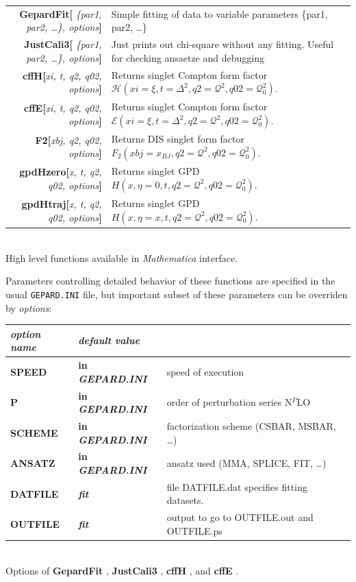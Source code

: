 \documentclass[12pt]{article}
\newcommand{\defboxitem}[3]{ {\ttfamily \bfseries #1[}\emph{#2}{\ttfamily \bfseries ]} & #3 }
\newcommand{\optboxitem}[3]{ {\ttfamily \bfseries #1} & {\ttfamily \bfseries #2 } & #3 }
\newcommand{\mmacomm}[1]{ {\ttfamily \bfseries #1} }
\begin{document}
\begin{flushleft}
\colorbox{defbox}{%
\begin{minipage}{\textwidth}%
\begin{tabular}{rp{8cm}}%
\defboxitem{GepardFit}{ \{par1, par2, \ldots\}, options}{Simple fitting of data to 
variable parameters \{par1, par2, \ldots\}} \\[0.8ex]
\defboxitem{JustCali3}{ \{par1, par2, \ldots\}, options}{Just prints out chi-square without
any fitting. Useful for checking ansaetze and debugging}\\[0.8ex]
\defboxitem{cffH}{xi, t, q2, q02, options}{Returns singlet Compton form factor
$\mathcal{H}(xi=\xi, t=\Delta^2, q2=\mathcal{Q}^2, q02=\mathcal{Q}_{0}^2)$.}\\[0.8ex]
\defboxitem{cffE}{xi, t, q2, q02, options}{Returns singlet Compton form factor
$\mathcal{E}(xi=\xi, t=\Delta^2, q2=\mathcal{Q}^2, q02=\mathcal{Q}_{0}^2)$.}\\[0.8ex] 
\defboxitem{F2}{xbj, q2, q02, options}{Returns DIS singlet form factor
$F_{2}(xbj=x_{BJ}, q2=\mathcal{Q}^2, q02=\mathcal{Q}_{0}^2)$.}\\[0.8ex] 
\defboxitem{gpdHzero}{x, t, q2, q02, options}{Returns singlet GPD
$H(x, \eta=0, t, q2=\mathcal{Q}^2, q02=\mathcal{Q}_{0}^2)$.}\\[0.8ex] 
\defboxitem{gpdHtraj}{x, t, q2, q02, options}{Returns singlet GPD
$H(x, \eta=x, t, q2=\mathcal{Q}^2, q02=\mathcal{Q}_{0}^2)$.}
\end{tabular}%
\end{minipage}}\\[0.5ex]
{\small High level functions available in \emph{Mathematica} interface.}
\end{flushleft}

Parameters controlling detailed behavior of these functions are specified in
the usual \texttt{GEPARD.INI} file, but important subset of these parameters can
be overriden by \emph{options}:

\begin{flushleft}
\colorbox{defbox}{%
\begin{minipage}{\textwidth}%
\begin{tabular}{llp{8cm}}%
\emph{option name} & \emph{default value} & \\ \hline
\optboxitem{SPEED}{in \emph{GEPARD.INI}}{speed of execution} \\
\optboxitem{P}{in \emph{GEPARD.INI}}{order of perturbation series N$^{P}$LO}\\
\optboxitem{SCHEME}{in \emph{GEPARD.INI}}{factorization scheme (CSBAR, MSBAR, \ldots)}\\
\optboxitem{ANSATZ}{in \emph{GEPARD.INI}}{ansatz used (MMA, SPLICE, FIT, \ldots)}\\
\optboxitem{DATFILE}{\emph{fit}}{file DATFILE.dat specifies fitting datasets.}\\
\optboxitem{OUTFILE}{\emph{fit}}{output to go to OUTFILE.out and OUTFILE.ps}
\end{tabular}%
\end{minipage}}\\[0.5ex]
{\small Options of \mmacomm{GepardFit}, \mmacomm{JustCali3}, \mmacomm{cffH}, 
and \mmacomm{cffE}.}
\end{flushleft}
\end{document}
